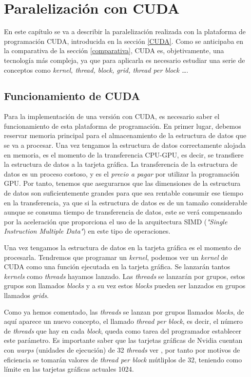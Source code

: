 \chapter{Paralelización con CUDA}
\label{ParalelizacionCUDA}

En este capítulo se va a describir la paralelización realizada con la plataforma de programación CUDA, introducida en la sección \ref{CUDA}. Como se anticipaba en la comparativa de la sección \ref{comparativa}, CUDA es, objetivamente, una tecnología más compleja, ya que para aplicarla es necesario estudiar una serie de conceptos como \textit{kernel, thread, block, grid, thread per block \dots }. 

\section{Funcionamiento de CUDA}
\label{FuncionamientoCUDA}
Para la implementación de una versión con CUDA, es necesario saber el funcionamiento de esta plataforma de programación. En primer lugar, debemos reservar memoria principal para el almacenamiento de la estructura de datos que se va a procesar. Una vez tengamos la estructura de datos correctamente alojada en memoria, es el momento de la transferencia CPU-GPU, es decir, se transfiere la estructura de datos a la tarjeta gráfica. La transferencia de la estructura de datos es un proceso costoso, y es el \textit{precio a pagar} por utilizar la programación GPU. Por tanto, tenemos que asegurarnos que las dimensiones de la estructura de datos son suficientemente grandes para que sea rentable consumir ese tiempo en la transferencia, ya que si la estructura de datos es de un tamaño considerable aunque se consuma tiempo de transferencia de datos, este se verá compensando por la aceleración que proporciona el uso de la arquitectura SIMD (\textit{"Single Instruction Multiple Data"}) en este tipo de operaciones.

Una vez tengamos la estructura de datos en la tarjeta gráfica es el momento de procesarla. Tendremos que programar un \textit{kernel}, podemos ver un \textit{kernel} de CUDA como una función ejecutada en la tarjeta gráfica. Se lanzarán tantos \textit{kernels} como \textit{threads} hayamos lanzado. Las \textit{threads} se lanzarán por grupos, estos grupos son llamados \textit{blocks} y a su vez estos \textit{blocks} pueden ser lanzados en grupos llamados \textit{grids}.

Como ya hemos comentado, las \textit{threads} se lanzan por grupos llamados \textit{blocks}, de aquí aparece un nuevo concepto, el llamado \textit{thread per block}, es decir, el número de \textit{threads} que hay en cada \textit{block}, queda como tarea del programador establecer este parámetro. Es importante saber que las tarjetas gráficas de Nvidia cuentan con \textit{warps} (unidades de ejecución) de 32 \textit{threads} ver \cite{unknown-author-2021G}, por tanto por motivos de eficiencia se tomarán valores de \textit{thread per block} mútliplos de 32, teniendo como límite en las tarjetas gráficas actuales 1024. 


